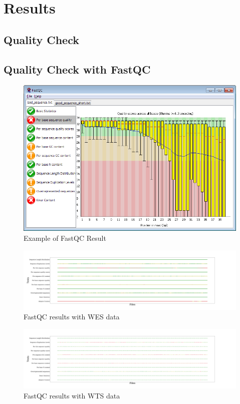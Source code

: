 \documentclass[a4paper]{article}
\begin{document}
    \section{Results}
        \subsection{Quality Check}
            \subsection{Quality Check with FastQC}
                \begin{figure}[htbp]
                    \centering
                    \includegraphics[width=0.6 \linewidth]{figures/Workflow/FastQC.png}
                    \caption{Example of FastQC Result \protect\cite{fastqc1}}
                    \label{fig:FastQC}
                \end{figure}

                \begin{figure}[htbp]
                    \centering
                    \includegraphics[width=0.8 \linewidth]{figures/FastQC/FastQC_WES.pdf}
                    \caption{FastQC results with WES data}
                    \label{fig:fastqc-WES}
                \end{figure}

                \begin{figure}[htbp]
                    \centering
                    \includegraphics[width=0.8 \linewidth]{figures/FastQC/FastQC_WTS.pdf}
                    \caption{FastQC results with WTS data}
                    \label{fig:fastqc-WTS}
                \end{figure}
\end{document}
